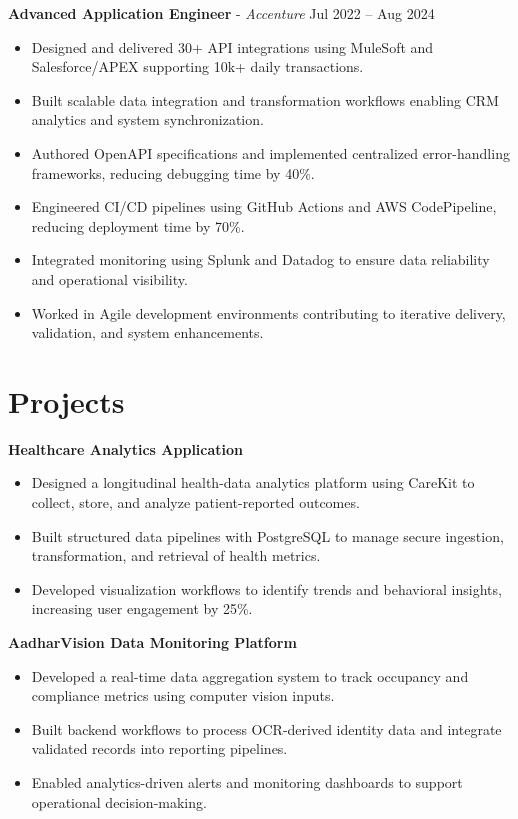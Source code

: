 \documentclass[letterpaper,11pt]{article}
\begin{document}
\textbf{Advanced Application Engineer} - \textit{Accenture} \hfill Jul 2022 -- Aug 2024
\begin{itemize}
\item Designed and delivered 30+ API integrations using MuleSoft and Salesforce/APEX supporting 10k+ daily transactions.
\item Built scalable data integration and transformation workflows enabling CRM analytics and system synchronization.
\item Authored OpenAPI specifications and implemented centralized error-handling frameworks, reducing debugging time by 40\%.
\item Engineered CI/CD pipelines using GitHub Actions and AWS CodePipeline, reducing deployment time by 70\%.
\item Integrated monitoring using Splunk and Datadog to ensure data reliability and operational visibility.
\item Worked in Agile development environments contributing to iterative delivery, validation, and system enhancements.
\end{itemize}

\section*{Projects}

\textbf{Healthcare Analytics Application}
\begin{itemize}
\item Designed a longitudinal health-data analytics platform using CareKit to collect, store, and analyze patient-reported outcomes.
\item Built structured data pipelines with PostgreSQL to manage secure ingestion, transformation, and retrieval of health metrics.
\item Developed visualization workflows to identify trends and behavioral insights, increasing user engagement by 25\%.
\end{itemize}


\textbf{AadharVision Data Monitoring Platform}
\begin{itemize}
\item Developed a real-time data aggregation system to track occupancy and compliance metrics using computer vision inputs.
\item Built backend workflows to process OCR-derived identity data and integrate validated records into reporting pipelines.
\item Enabled analytics-driven alerts and monitoring dashboards to support operational decision-making.
\end{itemize}
\end{document}
